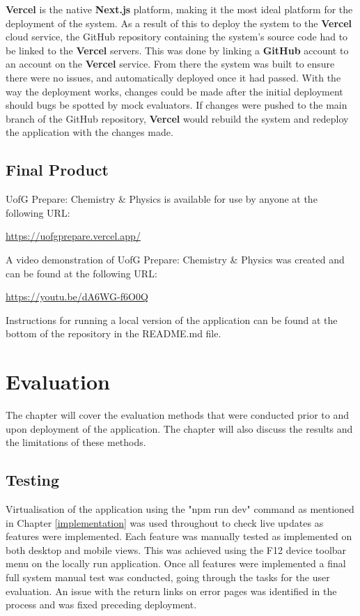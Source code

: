\documentclass{l4proj}
\begin{document}
\textbf{Vercel} is the native \textbf{Next.js} platform,  making it the most ideal platform for the deployment of the system. As a result of this to deploy the system to the \textbf{Vercel} cloud service,  the GitHub repository containing the system's source code had to be linked to the \textbf{Vercel} servers. This was done by linking a \textbf{GitHub} account to an account on the \textbf{Vercel} service. From there the system was built to ensure there were no issues,  and automatically deployed once it had passed. With the way the deployment works,  changes could be made after the initial deployment should bugs be spotted by mock evaluators. If changes were pushed to the main branch of the GitHub repository,  \textbf{Vercel} would rebuild the system and redeploy the application with the changes made.

\section{Final Product}
UofG Prepare: Chemistry \& Physics is available for use by anyone at the following URL:

\url{https://uofgprepare.vercel.app/}

A video demonstration of UofG Prepare: Chemistry \& Physics was created and can be found at the following URL:

\url{https://youtu.be/dA6WG-f6O0Q}

Instructions for running a local version of the application can be found at the bottom of the repository in the README.md file.

\chapter{Evaluation}

The chapter will cover the evaluation methods that were conducted prior to and upon deployment of the application. The chapter will also discuss the results and the limitations of these methods.

\section{Testing} \label{testing}
Virtualisation of the application using the "npm run dev" command as mentioned in Chapter \ref{implementation} was used throughout to check live updates as features were implemented. Each feature was manually tested as implemented on both desktop and mobile views. This was achieved using the F12 device toolbar menu on the locally run application. Once all features were implemented a final full system manual test was conducted,  going through the tasks for the user evaluation. An issue with the return links on error pages was identified in the process and was fixed preceding deployment.
\end{document}
